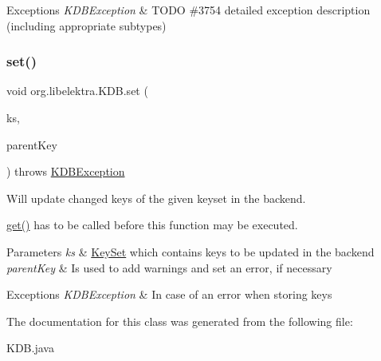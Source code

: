 \begin{DoxyExceptions}{Exceptions}
{\em K\+D\+B\+Exception} & T\+O\+DO \#3754 detailed exception description (including appropriate subtypes) \\
\hline
\end{DoxyExceptions}
\mbox{\label{classorg_1_1libelektra_1_1KDB_a4e7f86ca77f654bb11a38cdf6db6383f}} 
\subsubsection{\texorpdfstring{set()}{set()}}
{\footnotesize\ttfamily void org.\+libelektra.\+K\+D\+B.\+set (\begin{DoxyParamCaption}\item[{final \hyperlink{classorg_1_1libelektra_1_1KeySet}{Key\+Set}}]{ks,  }\item[{final \hyperlink{classorg_1_1libelektra_1_1Key}{Key}}]{parent\+Key }\end{DoxyParamCaption}) throws \hyperlink{classorg_1_1libelektra_1_1exception_1_1KDBException}{K\+D\+B\+Exception}\hspace{0.3cm}{\ttfamily [inline]}}



Will update changed keys of the given keyset in the backend. 

\hyperlink{classorg_1_1libelektra_1_1KDB_a600abc786bde91a3122bd96be991a3d5}{get()} has to be called before this function may be executed.


\begin{DoxyParams}{Parameters}
{\em ks} & \hyperlink{classorg_1_1libelektra_1_1KeySet}{Key\+Set} which contains keys to be updated in the backend \\
\hline
{\em parent\+Key} & Is used to add warnings and set an error, if necessary \\
\hline
\end{DoxyParams}

\begin{DoxyExceptions}{Exceptions}
{\em K\+D\+B\+Exception} & In case of an error when storing keys \\
\hline
\end{DoxyExceptions}


The documentation for this class was generated from the following file\+:\begin{DoxyCompactItemize}
\item 
K\+D\+B.\+java\end{DoxyCompactItemize}
